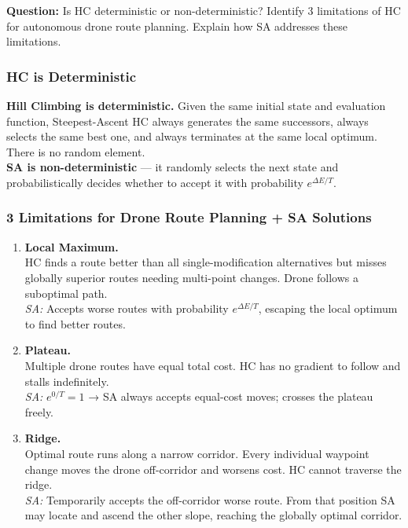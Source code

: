 \documentclass[12pt, a4paper]{article}
\newenvironment{solutionbox}{\begin{mdframed}[style=solutionframe]}{\end{mdframed}}
\begin{document}
\begin{solutionbox}
\textbf{Question:} Is HC deterministic or non-deterministic? Identify 3 limitations of HC for autonomous drone route planning. Explain how SA addresses these limitations.
\end{solutionbox}

\subsubsection*{HC is Deterministic}

\textbf{Hill Climbing is deterministic.} Given the same initial state and evaluation function, Steepest-Ascent HC always generates the same successors, always selects the same best one, and always terminates at the same local optimum. There is no random element.\\[0.3em]
\textbf{SA is non-deterministic} — it randomly selects the next state and probabilistically decides whether to accept it with probability $e^{\Delta E/T}$.

\subsubsection*{3 Limitations for Drone Route Planning + SA Solutions}

\begin{enumerate}[leftmargin=1.5cm, itemsep=8pt]
  \item \textbf{Local Maximum.}\\
        HC finds a route better than all single-modification alternatives but misses globally superior routes needing multi-point changes. Drone follows a suboptimal path.\\
        \textit{SA:} Accepts worse routes with probability $e^{\Delta E/T}$, escaping the local optimum to find better routes.

  \item \textbf{Plateau.}\\
        Multiple drone routes have equal total cost. HC has no gradient to follow and stalls indefinitely.\\
        \textit{SA:} $e^{0/T} = 1$ → SA always accepts equal-cost moves; crosses the plateau freely.

  \item \textbf{Ridge.}\\
        Optimal route runs along a narrow corridor. Every individual waypoint change moves the drone off-corridor and worsens cost. HC cannot traverse the ridge.\\
        \textit{SA:} Temporarily accepts the off-corridor worse route. From that position SA may locate and ascend the other slope, reaching the globally optimal corridor.
\end{enumerate}
\end{document}
